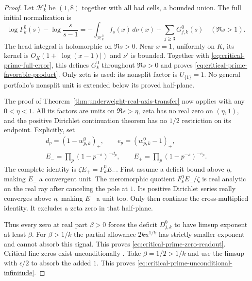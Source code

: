 \documentclass[11pt]{article}
\theoremstyle{definition}
\begin{document}
\begin{proof}
Let $\mathcal H_k^0$ be $(1,8)$ together with all bad cells,
a bounded union. The full initial normalization is
\begin{equation}
 \log F_k^0(s)-\log\frac{s}{s-1}
       =-\int_{\mathcal H_k^0}f_s(x)\,d\nu(x)
                    +\sum_{j\ge3}G^0_{j,k}(s)\quad(\Re s>1).
 \label{eq:critical-prime-complete-normalization}
\end{equation}
The head integral is holomorphic on $\Re s>0$.
Near $x=1$, uniformly on $K$, its kernel is
$O_K(1+|\log(x-1)|)$ and $\nu'$ is bounded.
Together with \eqref{eq:critical-prime-full-error}, this
defines $G_k^0$ throughout $\Re s>0$ and proves
\eqref{eq:critical-prime-favorable-product}.
Only zeta is used: its nonsplit factor is $U_{\{1\}}=1$.
No general portfolio's nonsplit unit is extended below
its proved half-plane.

The proof of Theorem~\ref{thm:underweight-real-axis-transfer}
now applies with any $0<\eta<1$.
All its factors are units on $\Re s>\eta$, zeta has no
real zero on $(\eta,1)$, and the positive Dirichlet
continuation theorem has no $1/2$ restriction on its endpoint.
Explicitly, set
\[
 \begin{gathered}
 d_p=(1-w^0_{p,k})_+,\qquad e_p=(w^0_{p,k}-1)_+,\\
 E_-=\prod_p(1-p^{-s})^{-d_p},\qquad
 E_+=\prod_p(1-p^{-s})^{-e_p}.
 \end{gathered}
\]
The complete identity is $\zeta E_+=F_k^0E_-$.
First assume a deficit bound above $\eta$, making $E_-$
a convergent unit. The meromorphic quotient $F_k^0E_-/\zeta$
is real analytic on the real ray after canceling the
pole at $1$. Its positive Dirichlet series really converges
above $\eta$, making $E_+$ a unit too.
Only then continue the cross-multiplied identity.
It excludes a zeta zero in that half-plane.

Thus every zero at real part $\beta>0$ forces the deficit
$D^0_{j,k}$ to have limsup exponent at least $\beta$.
For $\beta>1/k$ the partial allowance $2ku^{1/k}$ has
strictly smaller exponent and cannot absorb this signal.
This proves \eqref{eq:critical-prime-zero-readout}.
Critical-line zeros exist unconditionally
\cite[\S25.10(i)]{DLMFZetaZeros}.
Take $\beta=1/2>1/k$ and use the limsup with $\epsilon/2$
to absorb the added $1$. This proves
\eqref{eq:critical-prime-unconditional-infinitude}.
\end{proof}
\end{document}
